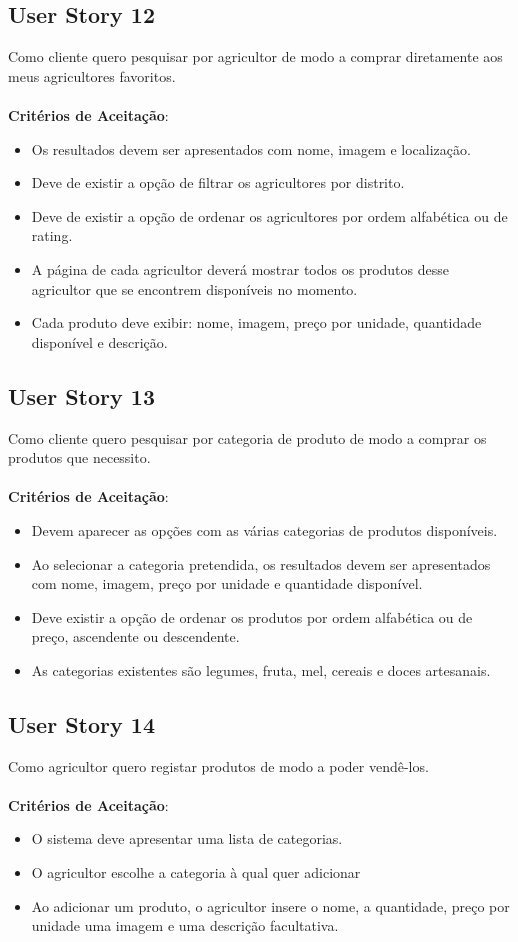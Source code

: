 \documentclass[a4paper,11pt]{article}
\begin{document}
\subsection{User Story 12}
Como cliente quero pesquisar por agricultor de modo a comprar diretamente aos meus agricultores favoritos.\\\\
\textbf{Critérios de Aceitação}:
\begin{itemize}
  \item Os resultados devem ser apresentados com nome, imagem e localização.
  \item Deve de existir a opção de filtrar os agricultores por distrito.
  \item Deve de existir a opção de ordenar os agricultores por ordem alfabética ou de rating.
  \item A página de cada agricultor deverá mostrar todos os produtos desse agricultor que se encontrem disponíveis no momento.
  \item Cada produto deve exibir: nome, imagem, preço por unidade, quantidade disponível e descrição.
\end{itemize}
\subsection{User Story 13}
Como cliente quero pesquisar por categoria de produto de modo a comprar os produtos que necessito.\\\\
\textbf{Critérios de Aceitação}:
\begin{itemize}
  \item Devem aparecer as opções com as várias categorias de produtos disponíveis.
  \item Ao selecionar a categoria pretendida, os resultados devem ser apresentados com nome, imagem, preço por unidade e quantidade disponível.
  \item Deve existir a opção de ordenar os produtos por ordem alfabética ou de preço, ascendente ou descendente.
  \item As categorias existentes são legumes, fruta, mel, cereais e doces artesanais.
\end{itemize}
\subsection{User Story 14}
Como agricultor quero registar produtos de modo a poder vendê-los.\\\\
\textbf{Critérios de Aceitação}:
\begin{itemize}
  \item O sistema deve apresentar uma lista de categorias.
  \item O agricultor escolhe a categoria à qual quer adicionar 
  \item Ao adicionar um produto, o agricultor insere o nome, a quantidade, preço por unidade uma imagem e uma descrição facultativa.
\end{itemize}
\end{document}
